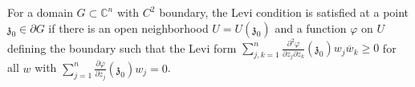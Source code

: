 For a domain $G \subset \mathbb{C}^n$ with $C^2$ boundary, the Levi condition is satisfied at a point $\mathfrak{z}_0 \in \partial G$ if there is an open neighborhood $U = U(\mathfrak{z}_0)$ and a function $\varphi$ on $U$ defining the boundary such that the Levi form $\sum_{j,k=1}^{n} \frac{\partial^2 \varphi}{\partial z_j \partial \overline{z}_k}(\mathfrak{z}_0) w_j \overline{w}_k \geqslant 0$ for all $w$ with $\sum_{j=1}^{n} \frac{\partial \varphi}{\partial z_j}(\mathfrak{z}_0) w_j = 0$.

